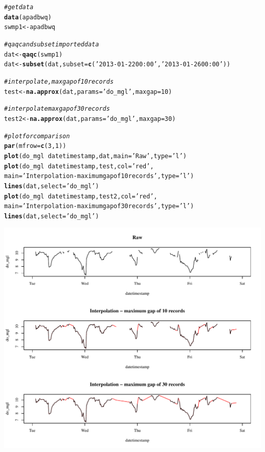 \documentclass[10pt,letterpaper]{article}\usepackage[]{graphicx}\usepackage[]{color}
\makeatletter
\def\maxwidth{ %
  \ifdim\Gin@nat@width>\linewidth
    \linewidth
  \else
    \Gin@nat@width
  \fi
}
\newcommand{\hlnum}[1]{\textcolor[rgb]{0.686,0.059,0.569}{#1}}%
\newcommand{\hlstr}[1]{\textcolor[rgb]{0.192,0.494,0.8}{#1}}%
\newcommand{\hlcom}[1]{\textcolor[rgb]{0.678,0.584,0.686}{\textit{#1}}}%
\newcommand{\hlopt}[1]{\textcolor[rgb]{0,0,0}{#1}}%
\newcommand{\hlstd}[1]{\textcolor[rgb]{0.345,0.345,0.345}{#1}}%
\newcommand{\hlkwb}[1]{\textcolor[rgb]{0.69,0.353,0.396}{#1}}%
\newcommand{\hlkwc}[1]{\textcolor[rgb]{0.333,0.667,0.333}{#1}}%
\newcommand{\hlkwd}[1]{\textcolor[rgb]{0.737,0.353,0.396}{\textbf{#1}}}%
\newenvironment{kframe}{%
 \def\at@end@of@kframe{}%
 \ifinner\ifhmode%
  \def\at@end@of@kframe{\end{minipage}}%
  \begin{minipage}{\columnwidth}%
 \fi\fi%
 \def\FrameCommand##1{\hskip\@totalleftmargin \hskip-\fboxsep
 \colorbox{shadecolor}{##1}\hskip-\fboxsep
     \hskip-\linewidth \hskip-\@totalleftmargin \hskip\columnwidth}%
 \MakeFramed {\advance\hsize-\width
   \@totalleftmargin\z@ \linewidth\hsize
   \@setminipage}}%
 {\par\unskip\endMakeFramed%
 \at@end@of@kframe}
\newenvironment{knitrout}{}{} %
\makeatother
\begin{document}
\begin{knitrout}
\color{fgcolor}\begin{kframe}
\begin{alltt}
\hlcom{# get data}
\hlkwd{data}\hlstd{(apadbwq)}
\hlstd{swmp1} \hlkwb{<-} \hlstd{apadbwq}

\hlcom{# qaqc and subset imported data}
\hlstd{dat} \hlkwb{<-} \hlkwd{qaqc}\hlstd{(swmp1)}
\hlstd{dat} \hlkwb{<-} \hlkwd{subset}\hlstd{(dat,} \hlkwc{subset} \hlstd{=} \hlkwd{c}\hlstd{(}\hlstr{'2013-01-22 00:00'}\hlstd{,} \hlstr{'2013-01-26 00:00'}\hlstd{))}

\hlcom{# interpolate, maxgap of 10 records}
\hlstd{test} \hlkwb{<-} \hlkwd{na.approx}\hlstd{(dat,} \hlkwc{params} \hlstd{=} \hlstr{'do_mgl'}\hlstd{,} \hlkwc{maxgap} \hlstd{=} \hlnum{10}\hlstd{)}

\hlcom{# interpolate maxgap of 30 records}
\hlstd{test2} \hlkwb{<-} \hlkwd{na.approx}\hlstd{(dat,} \hlkwc{params} \hlstd{=} \hlstr{'do_mgl'}\hlstd{,} \hlkwc{maxgap} \hlstd{=} \hlnum{30}\hlstd{)}

\hlcom{# plot for comparison}
\hlkwd{par}\hlstd{(}\hlkwc{mfrow} \hlstd{=} \hlkwd{c}\hlstd{(}\hlnum{3}\hlstd{,} \hlnum{1}\hlstd{))}
\hlkwd{plot}\hlstd{(do_mgl} \hlopt{~} \hlstd{datetimestamp, dat,} \hlkwc{main} \hlstd{=} \hlstr{'Raw'}\hlstd{,} \hlkwc{type} \hlstd{=} \hlstr{'l'}\hlstd{)}
\hlkwd{plot}\hlstd{(do_mgl} \hlopt{~} \hlstd{datetimestamp, test,} \hlkwc{col} \hlstd{=} \hlstr{'red'}\hlstd{,}
  \hlkwc{main} \hlstd{=} \hlstr{'Interpolation - maximum gap of 10 records'}\hlstd{,} \hlkwc{type} \hlstd{=} \hlstr{'l'}\hlstd{)}
\hlkwd{lines}\hlstd{(dat,} \hlkwc{select} \hlstd{=} \hlstr{'do_mgl'}\hlstd{)}
\hlkwd{plot}\hlstd{(do_mgl} \hlopt{~} \hlstd{datetimestamp, test2,} \hlkwc{col} \hlstd{=} \hlstr{'red'}\hlstd{,}
  \hlkwc{main} \hlstd{=} \hlstr{'Interpolation - maximum gap of 30 records'}\hlstd{,} \hlkwc{type} \hlstd{=} \hlstr{'l'}\hlstd{)}
\hlkwd{lines}\hlstd{(dat,} \hlkwc{select} \hlstd{=} \hlstr{'do_mgl'}\hlstd{)}
\end{alltt}
\end{kframe}

{\centering \includegraphics[width=\maxwidth]{figure/unnamed-chunk-16} 

}
\end{knitrout}
\end{document}
